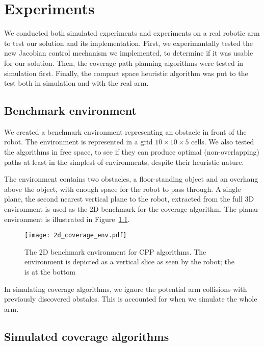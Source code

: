\documentclass[buriama8_dp.tex]{subfiles}
\begin{document}
\chapter{Experiments}

We conducted both simulated experiments and experiments on a real robotic arm to test our solution and its implementation. First, we experimantally tested the new Jacobian control mechanism we implemented, to determine if it was usable for our solution. Then, the coverage path planning algorithms were tested in simulation first. Finally, the compact space heuristic algorithm was put to the test both in simulation and with the real arm.

\section{Benchmark environment}
\label{sec:exp_cpp_env}

We created a benchmark environment representing an obstacle in front of the robot. The environment is represented in a grid \(10 \times 10 \times 5\) cells. We also tested the algorithms in free space, to see if they can produce optimal (non-overlapping) paths at least in the simplest of environments, despite their heuristic nature.

The environment contains two obstacles, a floor-standing object and an overhang above the object, with enough space for the robot to pass through. A single plane, the second nearest vertical plane to the robot, extracted from the full 3D environment is used as the 2D benchmark for the coverage algorithm. The planar environment is illustrated in Figure~\ref{fig:2d_env}.

\begin{figure}[htp]
  \centering
  \texttt{[image: 2d\_coverage\_env.pdf]}
  \caption[2D benchmark environment]{The 2D benchmark environment for CPP algorithms. The environment is depicted as a vertical slice as seen by the robot; the  is at the bottom}
  \label{fig:2d_env}
\end{figure}

In simulating coverage algorithms, we ignore the potential arm collisions with previously discovered obstales. This is accounted for when we simulate the whole arm.

\section{Simulated coverage algorithms}
\label{sec:exp_sim_coverage}
\end{document}
